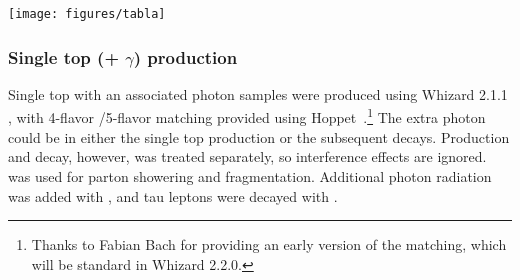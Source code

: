\begin{table}[ht!]
  \centering
  \caption{\ttgam\ samples used for the analysis. The LO cross-section for specified decay mode, k-factors (for NLO normalisation) and filter efficiencies are reported. The integrated luminosities corresponding to the total statistics in each sample are also given. The bottom group of samples was used to study systematic uncertainties.}
  \texttt{[image: figures/tabla]}
  \label{tab:bkg_ttbar_samples}
\end{table}

\subsubsection{Single top (+ $\gamma$) production}

Single top with an associated photon samples were produced using
Whizard 2.1.1 \cite{whizard, whizard2}, with 4-flavor /5-flavor
matching provided using Hoppet~\cite{hoppet}.\footnote{Thanks to
Fabian Bach for providing an early version of the matching, which
will be standard in Whizard 2.2.0.} The extra photon could be in
either the single top production or the subsequent decays. Production
and decay, however, was treated separately, so interference effects
are ignored. {\pythia} \cite{pythia} was used for parton showering and
fragmentation. Additional photon radiation was added with
{\photos} \cite{photos}, and tau leptons were decayed with
{\tauola} \cite{tauola}.

